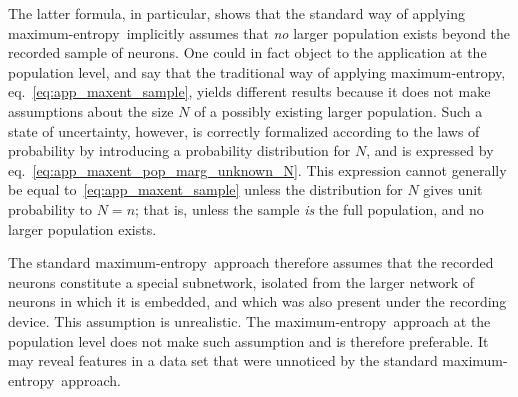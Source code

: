 \documentclass[\ifafour a4paper,12pt,\else a5paper,10pt,\fi%
onecolumn,oneside,article,%
british%
]{memoir}
\theoremstyle{remark}
\theoremstyle{innote}
\renewcommand*{\|}{\nonscript\,\vert\nonscript\;\mathopen{}}
\newcommand*{\eqn}{eq.}%
\newcommand*{\yNv}{N}
\newcommand*{\me}{maximum-entropy}
\begin{document}
The latter formula, in particular, shows that the standard way of applying
\me\ 
implicitly assumes that \emph{no} larger population exists beyond the
recorded sample of neurons. One could in fact object to the application at
the population level, and say that the traditional way of applying \me,
\eqn~\eqref{eq:app_maxent_sample}, yields different results because it does
not make assumptions about the size $\yNv$ of a possibly existing larger
population. Such a state of uncertainty, however, is correctly formalized
according to the laws of probability by introducing a probability
distribution for $\yNv$, and is expressed by
\eqn~\eqref{eq:app_maxent_pop_marg_unknown_N}. This expression cannot
generally be equal to~\eqref{eq:app_maxent_sample} unless the distribution
for $\yNv$ gives unit probability to $\yNv=n$; that is, unless the sample
\emph{is} the full population, and no larger population exists.

The standard \me\ approach therefore assumes that the recorded neurons
constitute a special subnetwork, isolated from the larger network of
neurons in which it is embedded, and which was also present under the
recording device. This assumption is unrealistic. The \me\ approach at the
population level does not make such assumption and is therefore preferable.
It may reveal features in a data set that were unnoticed by the standard
\me\ approach.

\end{document}
